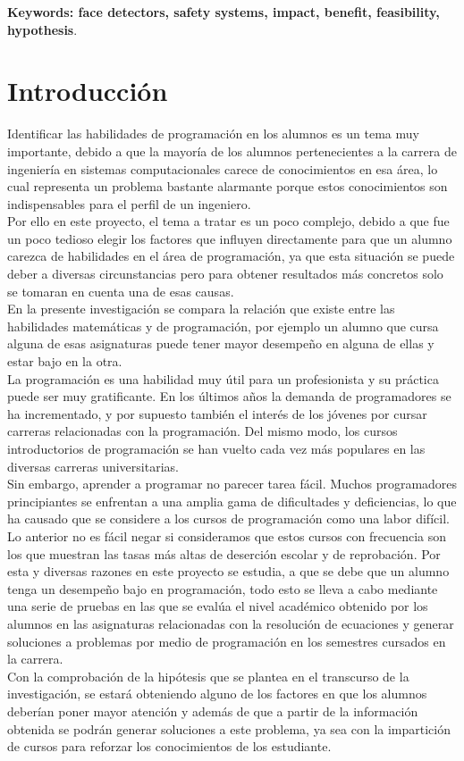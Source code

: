 \documentclass[12pt] {report}
\begin{document}
\textbf{\small Keywords: face detectors, safety systems, impact, benefit, feasibility, hypothesis}.

\section{Introducción}
Identificar las habilidades de programación en los alumnos es un tema muy importante, debido a que la mayoría de los alumnos pertenecientes a la carrera de ingeniería en sistemas computacionales carece de conocimientos en esa área, lo cual representa un problema bastante alarmante porque estos conocimientos son indispensables para el perfil de un ingeniero.\\
Por ello en este proyecto, el tema a tratar es un poco complejo, debido a que fue un poco tedioso elegir los factores que influyen directamente para que un alumno carezca de habilidades en el área de programación, ya que esta situación se puede deber a diversas circunstancias pero para obtener resultados más concretos solo se tomaran en cuenta una de esas causas.\\ 
En la presente investigación se compara la relación que existe entre las habilidades matemáticas y de programación, por ejemplo un alumno que cursa alguna de esas asignaturas puede tener mayor desempeño en alguna de ellas y estar bajo en la otra.\\
La programación es una habilidad muy útil para un profesionista y su práctica puede ser muy gratificante. En los últimos años la demanda de programadores se ha incrementado, y por supuesto también el interés de los jóvenes por cursar carreras relacionadas con la programación. Del mismo modo, los cursos introductorios de programación se han vuelto cada vez más populares en las diversas carreras universitarias.\\
Sin embargo, aprender a programar no parecer tarea fácil. Muchos programadores principiantes se enfrentan a una amplia gama de dificultades y deficiencias, lo que ha causado que se considere a los cursos de programación como una labor difícil. Lo anterior no es fácil negar si consideramos que estos cursos con frecuencia son los que muestran las tasas más altas de deserción escolar y de reprobación. 
Por esta y diversas razones en este proyecto se estudia, a que se debe que un alumno tenga un desempeño bajo en programación, todo esto se lleva a cabo mediante una serie de pruebas en las que se evalúa el nivel académico obtenido por los alumnos en las asignaturas relacionadas con la resolución de ecuaciones y generar soluciones a problemas por medio de programación en los semestres cursados en la carrera.\\
Con la comprobación de la hipótesis que se plantea en el transcurso de la investigación, se estará obteniendo alguno de los factores en que los alumnos deberían poner mayor atención y además de que a partir de la información obtenida se podrán generar soluciones a este problema, ya sea con la impartición de cursos para reforzar los conocimientos de los estudiante.\\ 
\\
\end{document}
